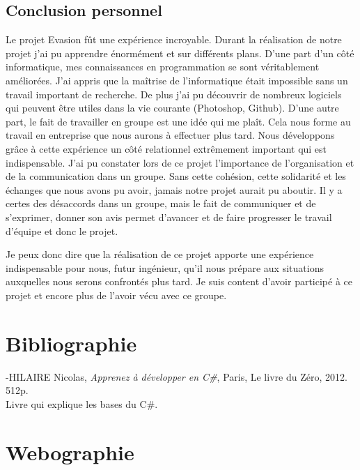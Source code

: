 \documentclass[12pt]{article}
\begin{document}
\subsection{Conclusion personnel}
Le projet Evasion fût une expérience incroyable. Durant la réalisation de notre projet j'ai pu apprendre énormément et sur différents plans. D'une part d'un côté informatique, mes connaissances en programmation se sont véritablement améliorées. J'ai appris que la maîtrise de l'informatique était impossible sans un travail important de recherche. De plus j'ai pu découvrir de nombreux logiciels qui peuvent être utiles dans la vie courante (Photoshop, Github). D'une autre part, le fait de travailler en groupe est une idée qui me plaît. Cela nous forme au travail en entreprise que nous aurons à effectuer plus tard. Nous développons grâce à cette expérience un côté relationnel extrêmement important qui est indispensable. J'ai pu constater lors de ce projet l'importance de l'organisation et de la communication dans un groupe. Sans cette cohésion, cette solidarité et les échanges que nous avons pu avoir, jamais notre projet aurait pu aboutir. Il y a certes des désaccords dans un groupe, mais le fait de communiquer et de s'exprimer, donner son avis permet d'avancer et de faire progresser le travail d'équipe et donc le projet.

Je peux donc dire que la réalisation de ce projet apporte une expérience indispensable pour nous, futur ingénieur, qu'il nous prépare aux situations auxquelles nous serons confrontés plus tard. Je suis content d'avoir participé à ce projet et encore plus de l'avoir vécu avec ce groupe.






\newpage

\section{Bibliographie}
\noindent
-HILAIRE Nicolas, \textit{Apprenez à développer en C\#}, Paris, Le livre du Zéro, 2012. 512p. \\
Livre qui explique les bases du C\#. 

\section{Webographie}
\end{document}
